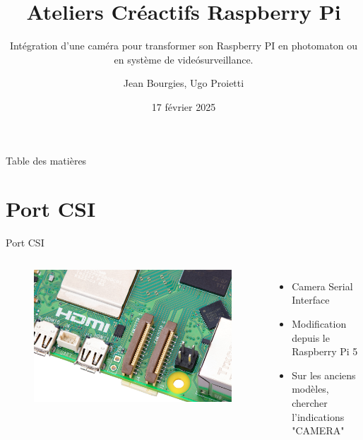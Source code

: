 \documentclass[aspectratio=169,xcolor=dvipsnames]{beamer}
\title{Ateliers Créactifs Raspberry Pi}
\subtitle{Intégration d'une caméra pour transformer son Raspberry PI en photomaton ou en système de videósurveillance.}
\author{Jean Bourgies, Ugo Proietti}
\date{17 février 2025}
\begin{document}
\begin{frame}
    \titlepage
\end{frame}

\begin{frame}{Table des matières}
    \tableofcontents
\end{frame}

\section{Port CSI}

\begin{frame}{Port CSI}
    \begin{columns}[c] %

        \begin{figure}
            \includegraphics[width=1\textwidth]{2/rpi-5-dsi-csi.jpg}
        \end{figure}

        \begin{itemize}
            \item Camera Serial Interface
            \item Modification depuis le Raspberry Pi 5
            \item Sur les anciens modèles, chercher l'indications "CAMERA"
        \end{itemize}

    \end{columns}
\end{frame}
\end{document}
